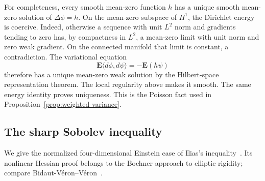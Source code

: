 For completeness, every smooth mean-zero function $h$ has a unique smooth
mean-zero solution of $\Delta\phi=h$. On the mean-zero subspace of $H^1$,
the Dirichlet energy is coercive. Indeed, otherwise a sequence with
unit $L^2$ norm and gradients tending to zero has, by compactness in
$L^2$, a mean-zero limit with unit norm and zero weak gradient. On the
connected manifold that limit is constant, a contradiction. The
variational equation
\[
 \mathbf E\langle d\phi,d\psi\rangle=-\mathbf E(h\psi)
\]
therefore has a unique mean-zero weak solution by the Hilbert-space
representation theorem. The local regularity above makes it smooth.
The same energy identity proves uniqueness. This is the Poisson fact
used in Proposition~\ref{prop:weighted-variance}.

\subsection{The sharp Sobolev inequality}
\label{app:sharp-sobolev}

We give the normalized four-dimensional Einstein case of Ilias's
inequality~\cite[Theorem~3]{Ilias}. Its nonlinear Hessian proof belongs
to the Bochner approach to elliptic rigidity; compare
Bidaut-V\'eron--V\'eron~\cite{BidautVeronVeron}.

